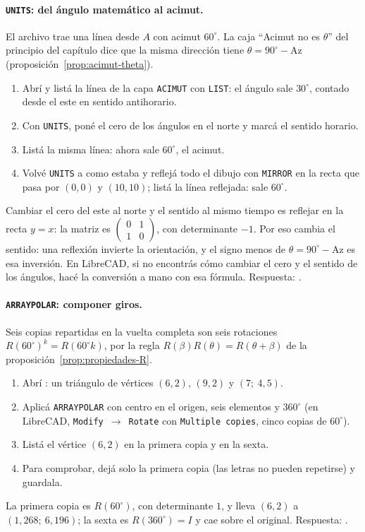 \paragraph{\texttt{UNITS}: del ángulo matemático al acimut.} El archivo trae una línea desde
\(A\) con acimut \(60^\circ\). La caja \enquote{Acimut no es \(\theta\)} del principio del
capítulo dice que la misma dirección tiene \(\theta=90^\circ-\mathrm{Az}\)
(proposición~\ref{prop:acimut-theta}).
\begin{enumerate}
  \item Abrí  y listá la línea de la capa \texttt{ACIMUT} con
  \texttt{LIST}: el ángulo sale \(30^\circ\), contado desde el este en sentido antihorario.
  \item Con \texttt{UNITS}, poné el cero de los ángulos en el norte y marcá el sentido horario.
  \item Listá la misma línea: ahora sale \(60^\circ\), el acimut.
  \item Volvé \texttt{UNITS} a como estaba y reflejá todo el dibujo con \texttt{MIRROR} en la
  recta que pasa por \((0,0)\) y \((10,10)\); listá la línea reflejada: sale \(60^\circ\).
\end{enumerate}
Cambiar el cero del este al norte y el sentido al mismo tiempo es reflejar en la recta \(y=x\):
la matriz es \(\left(\begin{smallmatrix}0&1\\1&0\end{smallmatrix}\right)\), con determinante
\(-1\). Por eso cambia el sentido: una reflexión invierte la orientación, y el signo menos de
\(\theta=90^\circ-\mathrm{Az}\) es esa inversión. En LibreCAD, si no encontrás cómo cambiar el
cero y el sentido de los ángulos, hacé la conversión a mano con esa fórmula. Respuesta:
.

\paragraph{\texttt{ARRAYPOLAR}: componer giros.} Seis copias repartidas en la vuelta completa
son seis rotaciones \(R(60^\circ)^k=R(60^\circ k)\), por la regla
\(R(\beta)R(\theta)=R(\theta+\beta)\) de la proposición~\ref{prop:propiedades-R}.
\begin{enumerate}
  \item Abrí : un triángulo de vértices \((6,2)\), \((9,2)\) y
  \((7;\ 4{,}5)\).
  \item Aplicá \texttt{ARRAYPOLAR} con centro en el origen, seis elementos y \(360^\circ\) (en
  LibreCAD, \texttt{Modify}~\(\to\)~\texttt{Rotate} con \texttt{Multiple copies}, cinco copias de \(60^\circ\)).
  \item Listá el vértice \((6,2)\) en la primera copia y en la sexta.
  \item Para comprobar, dejá solo la primera copia (las letras no pueden repetirse) y guardala.
\end{enumerate}
La primera copia es \(R(60^\circ)\), con determinante \(1\), y lleva \((6,2)\) a
\((1{,}268;\ 6{,}196)\); la sexta es \(R(360^\circ)=I\) y cae sobre el original. Respuesta:
.

